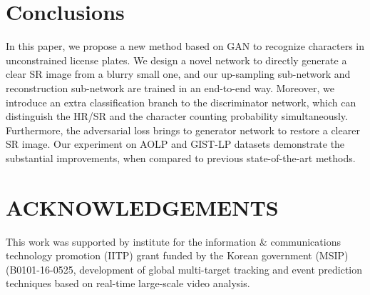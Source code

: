 \documentclass[a4paper,twoside]{article}
\begin{document}
\section{Conclusions}
\label{sec:conclusion}
    In this paper, we propose a new method based on GAN to recognize characters in unconstrained license plates. We design a novel network to directly generate a clear SR image from a blurry small one, and our up-sampling sub-network and reconstruction sub-network are trained in an end-to-end way. Moreover, we introduce an extra classification branch to the discriminator network, which can distinguish the HR/SR and the character counting probability simultaneously. Furthermore, the adversarial loss brings to generator network to restore a clearer SR image. Our experiment on AOLP and GIST-LP datasets demonstrate the substantial improvements, when compared to previous state-of-the-art methods.


\section*{\uppercase{Acknowledgements}}

\noindent This work was supported by institute for the information \& communications technology promotion (IITP) grant funded by the Korean government (MSIP) (B0101-16-0525, development of global multi-target tracking and event prediction techniques based on real-time large-scale video analysis. 


\vfill

{\small
}

\vfill
\end{document}
